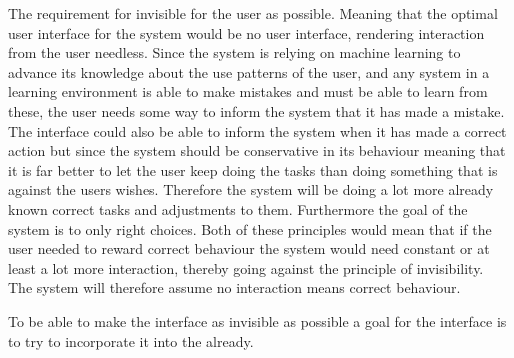 The requirement for invisible for the user as possible. Meaning that the optimal user interface for the system would be no user interface, rendering  interaction from the user needless. Since the system is relying on machine learning to advance its knowledge about the use patterns of the user, and any system in a learning environment is able to make mistakes and must be able to learn from these, the user needs some way to inform the system that it has made a mistake. The interface could also be able to inform the system when it has made a correct action but since the system should be conservative in its behaviour meaning that it is far better to let the user keep doing the tasks than doing something that is against the users wishes. Therefore the system will be doing a lot more already known correct tasks and adjustments to them. Furthermore the goal of the system is to only right choices. Both of these principles would mean that if the user needed to reward correct behaviour the system would need constant or at least a lot more interaction, thereby going against the principle of invisibility. The system will therefore assume no interaction means correct behaviour.
 
To be able to make the interface as invisible as possible a goal for the interface is to try to incorporate it into the already.
